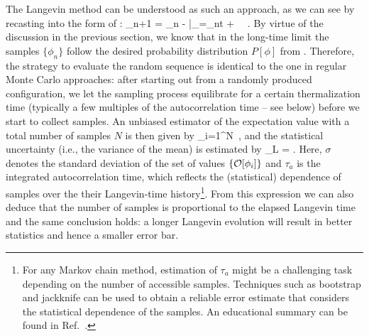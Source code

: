 \documentclass[../main.tex]{subfiles}
\begin{document}
The Langevin method can be understood as such an approach, as we can see by recasting  into the form of :
\beq
  \label{Eq:discrete_langevin}
  \phi_{n+1} = \phi_{n} - \bigg|_{\phi=\phi_n}\Delta t + \, \eta \, .
\eeq
%
By virtue of the discussion in the previous section, we know that in the long-time limit the samples $\{\phi_n\}$ follow the desired probability distribution $P[\phi]$ from . Therefore, the strategy to evaluate the random sequence is identical to the one in regular Monte Carlo approaches: after starting out from a randomly produced configuration, we let the sampling process equilibrate for a certain thermalization time (typically a few multiples of the autocorrelation time -- see below) before we start to collect samples. An unbiased estimator of the expectation value with a total number of samples $N$ is then given by
%
\beq
  \label{Eq:mc_average}
  \langle \CO \rangle \approx {} \sum_{i=1}^{N}{\CO[\phi_i]}\, ,
\eeq
%
and the statistical uncertainty (i.e., the variance of the mean) is estimated by
%
\beq
  \label{Eq:mc_error}
  \sigma_L = \sigma {}.
\eeq
%
Here, $\sigma$ denotes the standard deviation of the set of values $\{ {\mathcal O}[\phi_i]\}$ and $\tau_a$ is the integrated autocorrelation time, which reflects the (statistical) dependence of samples over the their Langevin-time history\footnote{For any Markov chain method, estimation of $\tau_a$ might be a challenging task depending on the number of accessible samples. Techniques such as bootstrap and jackknife can be used to obtain a reliable error estimate that considers the statistical dependence of the samples. An educational summary can be found in Ref.~\cite{Troyer2012}.}. From this expression we can also deduce that the number of samples is proportional to the elapsed Langevin time and the same conclusion holds: a longer Langevin evolution will result in better statistics and hence a smaller error bar.
\end{document}
